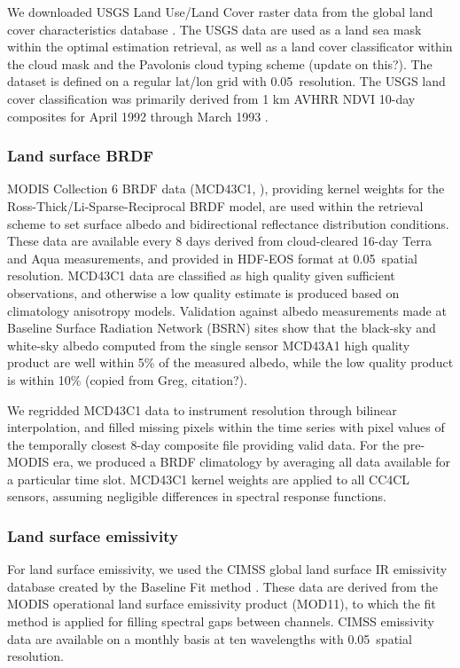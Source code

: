 We downloaded USGS Land Use/Land Cover raster data from the global land cover characteristics database \citep{USGS}. The USGS data are used as a land sea mask within the optimal estimation retrieval, as well as a land cover classificator within the cloud mask and the Pavolonis cloud typing scheme (update on this?). The dataset is defined on a regular lat/lon grid with 0.05\textdegree\ resolution. The USGS land cover classification was primarily derived from 1 km AVHRR NDVI 10-day composites for April 1992 through March 1993 \citep{USGS}. 

\subsubsection{Land surface BRDF}\label{sec:BRDF}

MODIS Collection 6 BRDF data (MCD43C1, \citet{MODIS_BRDF}), providing kernel weights for the Ross-Thick/Li-Sparse-Reciprocal BRDF model, are used within the retrieval scheme to set surface albedo and bidirectional reflectance distribution conditions. These data are available every 8 days derived from cloud-cleared 16-day Terra and Aqua measurements, and provided in HDF-EOS format at 0.05\textdegree\ spatial resolution. MCD43C1 data are classified as high quality given sufficient observations, and otherwise a low quality estimate is produced based on climatology anisotropy models. Validation against albedo measurements made at Baseline Surface Radiation Network (BSRN) sites show that the black-sky and white-sky albedo computed from the single sensor MCD43A1 high quality product are well within 5\% of the measured albedo, while the low quality product is within 10\% (copied from Greg, citation?).

We regridded MCD43C1 data to instrument resolution through bilinear interpolation, and filled missing pixels within the time series with pixel values of the temporally closest 8-day composite file providing valid data. For the pre-MODIS era, we produced a BRDF climatology by averaging all data available for a particular time slot. MCD43C1 kernel weights are applied to all CC4CL sensors, assuming negligible differences in spectral response functions. 

\subsubsection{Land surface emissivity}\label{sec:emissivity}

For land surface emissivity, we used the CIMSS global land surface IR emissivity database created by the Baseline Fit method \citep{Seemann08}. These data are derived from the MODIS operational land surface emissivity product (MOD11), to which the fit method is applied for filling spectral gaps between channels. CIMSS emissivity data are available on a monthly basis at ten wavelengths with 0.05\textdegree\ spatial resolution.


